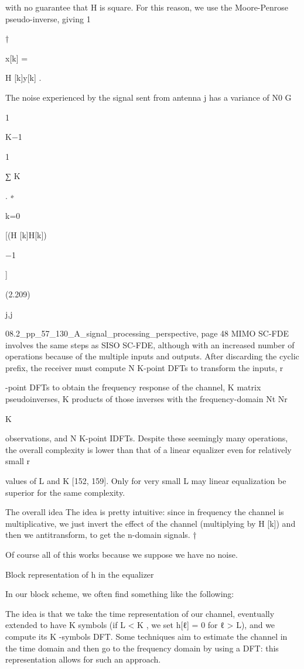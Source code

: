 {{{with no guarantee that H is square. For this reason, we use the Moore-Penrose pseudo-inverse, giving 1

†

x[k] =

H [k]y[k] .
\sqrtG

The noise experienced by the signal sent from antenna j has a variance of N0 G

1

K−1

1

∑
K

.
∗

k=0

[(H [k]H[k])

−1

]

(2.209)

j,j

08.2_pp_57_130_A_signal_processing_perspective, page 48 MIMO SC-FDE involves the same steps as SISO SC-FDE, although with an increased number of operations because of the multiple inputs and outputs. After discarding the cyclic prefix, the receiver must compute N K-point DFTs to transform the inputs,
r

-point DFTs to obtain the frequency response of the channel, K matrix pseudoinverses, K products of those inverses with the frequency-domain Nt Nr

K

observations, and N K-point IDFTs. Despite these seemingly many operations, the overall complexity is lower than that of a linear equalizer even for relatively small r

values of L and K [152, 159]. Only for very small L may linear equalization be superior for the same complexity.

​The overall idea The idea is pretty intuitive: since in frequency the channel is multiplicative, we just invert the effect of the channel (multiplying by H [k]) and then we antitransform, to get the n-domain signals.
†

Of course all of this works because we suppose we have no noise.

Block representation of h in the equalizer

In our block scheme, we often find something like the following:

The idea is that we take the time representation of our channel, eventually extended to have K symbols (if L < K , we set h[ℓ] = 0 for ℓ > L), and we compute its K -symbols DFT.
Some techniques aim to estimate the channel in the time domain and then go to the frequency domain by using a DFT: this representation allows for such an approach.

}}}
